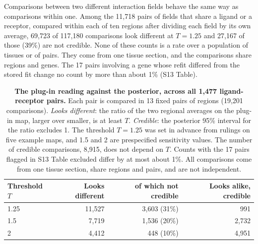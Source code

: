 \documentclass[10pt,letterpaper]{article}
\begin{document}
Comparisons between two different interaction fields behave the same way as comparisons within one. Among the 11,718 pairs of fields that share a ligand or a receptor, compared within each of ten regions after dividing each field by its own average, 69,723 of 117,180 comparisons look different at $T = 1.25$ and 27,167 of those (39\%) are not credible. None of these counts is a rate over a population of tissues or of pairs. They come from one tissue section, and the comparisons share regions and genes. The 17 pairs involving a gene whose refit differed from the stored fit change no count by more than about 1\% (S13 Table).

\begin{table}[!ht]
\centering
\caption{{\bf The plug-in reading against the posterior, across all 1,477 ligand-receptor pairs.} Each pair is compared in 13 fixed pairs of regions (19,201 comparisons). \textit{Looks different}: the ratio of the two regional averages on the plug-in map, larger over smaller, is at least $T$. \textit{Credible}: the posterior 95\% interval for the ratio excludes 1. The threshold $T = 1.25$ was set in advance from rulings on five example maps, and 1.5 and 2 are prespecified sensitivity values. The number of credible comparisons, 8,915, does not depend on $T$. Counts with the 17 pairs flagged in S13 Table excluded differ by at most about 1\%. All comparisons come from one tissue section, share regions and pairs, and are not independent.}
\label{tab:systematic}
\begin{tabular}{|l|rrr|}
  \hline
  Threshold $T$ & Looks different & of which not credible & Looks alike, credible \\
  \hline
  1.25 & 11,527 & 3,603 (31\%) & 991 \\
  1.5  & 7,719 & 1,536 (20\%) & 2,732 \\
  2    & 4,412 & 448 (10\%) & 4,951 \\
  \hline
\end{tabular}
\end{table}
\end{document}
